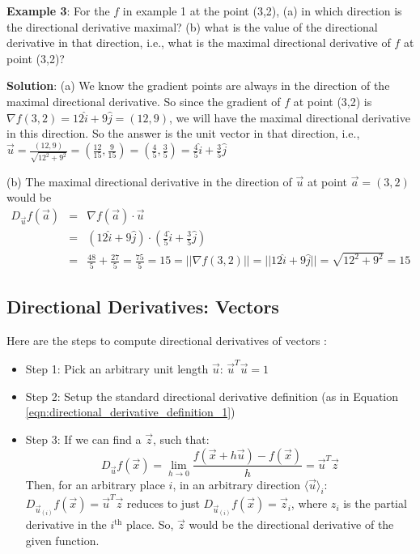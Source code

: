 \documentclass[conference,final,11pt,technote,onecolumn]{IEEEtran}\usepackage[]{graphicx}\usepackage[]{color}
\begin{document}
\textbf{Example 3}: For the $f$ in example 1 at the point (3,2), (a) in which direction is the directional derivative maximal? (b) what is the value of the directional derivative in that direction, i.e., what is the maximal directional derivative of $f$ at point (3,2)?

\textbf{Solution}: (a) We know the gradient points are always in the direction of the maximal directional derivative. So since the gradient of $f$ at point (3,2) is $\nabla f(3,2) = 12\hat{i} + 9\hat{j} = (12,9)$, we will have the maximal directional derivative in this direction. So the answer is the unit vector in that direction, i.e., $\vec u = \frac{(12,9)}{\sqrt{12^2+9^2}} = (\frac{12}{15},\frac{9}{15}) = (\frac{4}{5},\frac{3}{5}) = \frac{4}{5}\hat{i}+\frac{3}{5}\hat{j}$

(b) The maximal directional derivative in the direction of $\vec u$ at point $\vec a =(3,2)$ would be
\begin{eqnarray}
\nonumber D_{\vec u}f(\vec a) &=& \nabla f(\vec a)\cdot \vec u\\
\nonumber &=& (12\hat{i}+9\hat{j})\cdot (\frac{4}{5}\hat{i} + \frac{3}{5}\hat{j})\\
\nonumber &=& \frac{48}{5} + \frac{27}{5} = \frac{75}{5} = 15 = ||\nabla f(3,2)|| = ||12\hat{i}+9\hat{j}|| =  \sqrt{12^2+9^2} = 15
\end{eqnarray}
\subsection{Directional Derivatives: Vectors}
Here are the steps to compute directional derivatives of vectors \cite{pres:withoutATrace}:
\begin{itemize}
	\item Step 1: Pick an arbitrary unit length $\vec u$: $\vec u^T\vec u = 1$
	\item Step 2: Setup the standard directional derivative definition (as in Equation \ref{eqn:directional_derivative_definition_1})
	\item Step 3: If we can find a $\vec z$, such that:
	\[ D_{\vec u}f(\vec x) = \lim_{h\rightarrow 0}\dfrac{f(\vec x+h\vec u)-f(\vec x)}{h} = \vec u^T \vec z \]
	Then, for an arbitrary place $i$, in an arbitrary direction $\langle \vec u\rangle_i$: $D_{\vec u_{(i)}}f(\vec x) = \vec u^T \vec z$ reduces to just $D_{\vec u_{(i)}}f(\vec x) = \vec z_i$, where $z_i$ is the partial derivative in the $i^\text{th}$ place. So, $\vec z$ would be the directional derivative of the given function.
\end{itemize}
\end{document}
